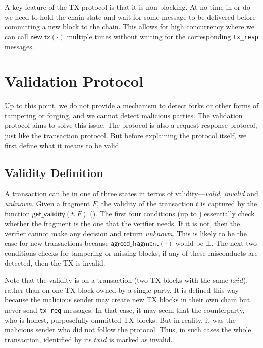 A key feature of the TX protocol is that it is non-blocking.
At no time in  or  do we need to hold the chain state and wait for some message to be delivered before committing a new block to the chain.
This allows for high concurrency where we can call $\textsf{new\_tx}(\cdot)$ multiple times without waiting for the corresponding \texttt{tx\_resp} messages.

\section{Validation Protocol}
\label{sec:vd-protocol}

Up to this point, we do not provide a mechanism to detect forks or other forms of tampering or forging, and we cannot detect malicious parties.
The validation protocol aims to solve this issue.
The protocol is also a request-response protocol, just like the transaction protocol.
But before explaining the protocol itself, we first define what it means to be valid.

\subsection{Validity Definition}
A transaction can be in one of three states in terms of validity---\emph{valid}, \emph{invalid} and \emph{unknown}.
Given a fragment $F$, the validity of the transaction $t$ is captured by the function $\textsf{get\_validity}(t, F)$ ().
The first four conditions (up to ) essentially check whether the fragment is the one that the verifier needs.
If it is not, then the verifier cannot make any decision and return \emph{unknown}.
This is likely to be the case for new transactions because $\textsf{agreed\_fragment}(\cdot)$ would be $\bot$.
The next two conditions checks for tampering or missing blocks, if any of these misconducts are detected, then the TX is invalid.

Note that the validity is on a transaction (two TX blocks with the same $txid$), rather than on one TX block owned by a single party.
It is defined this way because the malicious sender may create new TX blocks in their own chain but never send \texttt{tx\_req} messages.
In that case, it may seem that the counterparty, who is honest, purposefully ommitted TX blocks.
But in reality, it was the malicious sender who did not follow the protocol.
Thus, in such cases the whole transaction, identified by its $txid$ is marked as invalid.

